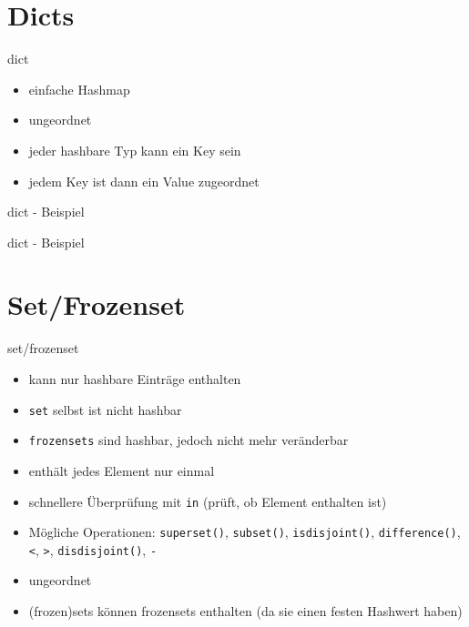 \section{Dicts}

\begin{frame}{dict}
	\begin{itemize}
		\item einfache Hashmap
		\item ungeordnet
		\item jeder hashbare Typ kann ein Key sein
		\item jedem Key ist dann ein Value zugeordnet
	\end{itemize}
\end{frame}

\begin{frame}{dict - Beispiel}
    
\end{frame}

\begin{frame}{dict - Beispiel}
    
\end{frame}


\section{Set/Frozenset}

\begin{frame}{set/frozenset}
	\begin{itemize}
		\item kann nur hashbare Einträge enthalten
		\item \texttt{set} selbst ist nicht hashbar
		\item \texttt{frozensets} sind hashbar, jedoch nicht mehr veränderbar
		\item enthält jedes Element nur einmal
		\item schnellere Überprüfung mit \alert{\texttt{in}} (prüft, ob Element enthalten ist)
		\item Mögliche Operationen: \alert{\texttt{superset()}}, \alert{\texttt{subset()}}, \alert{\texttt{isdisjoint()}}, \alert{\texttt{difference()}}, \alert{\texttt{<}}, \alert{\texttt{>}}, \alert{\texttt{disdisjoint()}}, \alert{\texttt{-}}
		\item ungeordnet
		\item (frozen)sets können frozensets enthalten (da sie einen festen Hashwert haben)
	\end{itemize}
\end{frame}

